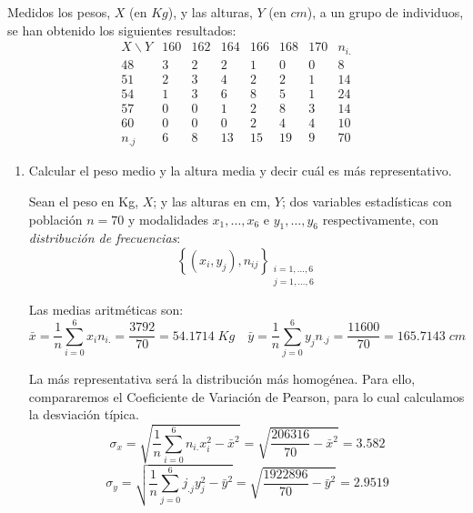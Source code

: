 \begin{ejercicio}
    Medidos los pesos, $X$ (en $Kg$), y las alturas, $Y$ (en $cm$), a un grupo de individuos, se han obtenido los siguientes resultados:
    \begin{equation*}
        \begin{array}{c|cccccc|c}
            X\backslash Y & 160 & 162 & 164 & 166 & 168 & 170 & n_{i.}\\ \hline
            48 & 3 & 2 & 2 & 1 & 0 & 0 & 8 \\
            51 & 2 & 3 & 4 & 2 & 2 & 1 & 14\\
            54 & 1 & 3 & 6 & 8 & 5 & 1 & 24\\
            57 & 0 & 0 & 1 & 2 & 8 & 3 & 14\\
            60 & 0 & 0 & 0 & 2 & 4 & 4 & 10\\ \hline
            n_{.j} & 6 & 8 & 13 & 15 & 19 & 9 & 70
        \end{array}
    \end{equation*}
    \begin{enumerate}
        \item Calcular el peso medio y la altura media y decir cuál es más representativo.

        Sean el peso en Kg, $X$; y las alturas en cm, $Y$; dos variables estadísticas con población $n=70$ y modalidades $x_1, \dots, x_6$ e $y_1, \dots, y_6$ respectivamente, con \emph{distribución de frecuencias}:
        $$\left\{ (x_i,y_j), n_{ij}\right\}_{\substack{i=1,\dots,6\\j=1,\dots,6}}$$

        Las medias aritméticas son:
        \begin{equation*}
            \bar{x} = \frac{1}{n} \sum_{i=0}^6 x_in_{i.} = \frac{3792}{70} = 54.1714\;Kg
            \quad
            \bar{y} = \frac{1}{n} \sum_{j=0}^6 y_jn_{.j} = \frac{11600}{70} = 165.7143\;cm
        \end{equation*}

       La más representativa será la distribución más homogénea. Para ello, compararemos el Coeficiente de Variación de Pearson, para lo cual calculamos la desviación típica.
       \begin{equation*}
           \sigma_x = \sqrt{\frac{1}{n} \sum_{i=0}^6 n_{i.}x_i^2 - \bar{x}^2} = \sqrt{\frac{206316}{70} - \bar{x}^2} = 3.582
       \end{equation*}
       \begin{equation*}
           \sigma_y = \sqrt{\frac{1}{n} \sum_{j=0}^6 j_{.j}y_j^2 - \bar{y}^2} = \sqrt{\frac{1922896}{70} - \bar{y}^2} = 2.9519
       \end{equation*}


\end{enumerate}
\end{ejercicio}
